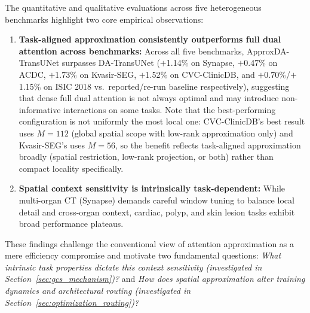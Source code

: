 The quantitative and qualitative evaluations across five heterogeneous benchmarks highlight two core empirical observations:
\begin{enumerate}
  \item \textbf{Task-aligned approximation consistently outperforms full dual attention across benchmarks:} Across all five benchmarks, ApproxDA-TransUNet surpasses DA-TransUNet ($+$1.14\% on Synapse, $+$0.47\% on ACDC, $+$1.73\% on Kvasir-SEG, $+$1.52\% on CVC-ClinicDB, and $+$0.70\%/$+$1.15\% on ISIC 2018 vs.\ reported/re-run baseline respectively), suggesting that dense full dual attention is not always optimal and may introduce non-informative interactions on some tasks. Note that the best-performing configuration is not uniformly the most local one: CVC-ClinicDB's best result uses $M{=}112$ (global spatial scope with low-rank approximation only) and Kvasir-SEG's uses $M{=}56$, so the benefit reflects task-aligned approximation broadly (spatial restriction, low-rank projection, or both) rather than compact locality specifically.
  \item \textbf{Spatial context sensitivity is intrinsically task-dependent:} While multi-organ CT (Synapse) demands careful window tuning to balance local detail and cross-organ context, cardiac, polyp, and skin lesion tasks exhibit broad performance plateaus.
\end{enumerate}
These findings challenge the conventional view of attention approximation as a mere efficiency compromise and motivate two fundamental questions: \emph{What intrinsic task properties dictate this context sensitivity (investigated in Section~\ref{sec:gcs_mechanism})?} and \emph{How does spatial approximation alter training dynamics and architectural routing (investigated in Section~\ref{sec:optimization_routing})?}

